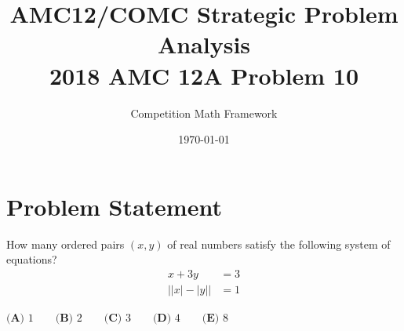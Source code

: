 \documentclass[]{article}
\begin{document}
\title{AMC12/COMC Strategic Problem Analysis\\2018 AMC 12A Problem 10}
\author{Competition Math Framework}
\date{\today}
\maketitle

\section*{Problem Statement}
How many ordered pairs $(x,y)$ of real numbers satisfy the following system of equations?
\begin{align*}
x + 3y &= 3 \\
\left| |x| - |y| \right| &= 1
\end{align*}

$\textbf{(A) } 1 \qquad \textbf{(B) } 2 \qquad \textbf{(C) } 3 \qquad \textbf{(D) } 4 \qquad \textbf{(E) } 8$
\end{document}
